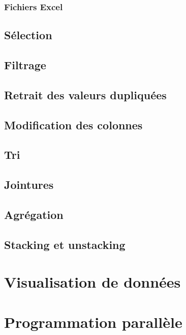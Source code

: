 \documentclass[12pt,]{book}
\numberwithin{equation}{section}
\numberwithin{countremarque}{section}
\begin{document}
\subsection{Fichiers Excel}\label{pandas-importation-excel}

\section{Sélection}\label{selection}

\section{Filtrage}\label{filtrage}

\section{Retrait des valeurs
dupliquées}\label{retrait-des-valeurs-dupliquees}

\section{Modification des colonnes}\label{modification-des-colonnes}

\section{Tri}\label{tri-1}

\section{Jointures}\label{jointures}

\section{Agrégation}\label{agregation}

\section{Stacking et unstacking}\label{stacking-et-unstacking}

\chapter{Visualisation de données}\label{visualisation-de-donnees}

\chapter{Programmation parallèle}\label{programmation-parallele}
\end{document}
